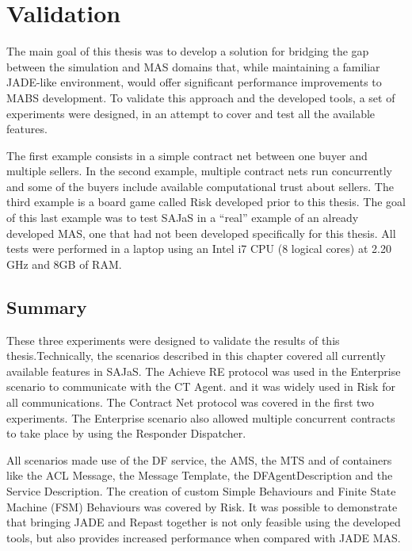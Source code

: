 \chapter{Validation}
\label{chap:validation}

The main goal of this thesis was to develop a solution for bridging the gap between the simulation and MAS domains that, while maintaining a familiar JADE-like environment, would offer significant performance improvements to MABS development. To validate this approach and the developed tools, a set of experiments were designed, in an attempt to cover and test all the available features.

The first example consists in a simple contract net between one buyer and multiple sellers. In the second example, multiple contract nets run concurrently and some of the buyers include available computational trust about sellers. 
The third example is a board game called Risk developed prior to this thesis. The goal of this last example was to test SAJaS in a ``real'' example of an already developed MAS, one that had not been developed specifically for this thesis.
All tests were performed in a laptop using an Intel i7 CPU (8 logical cores) at 2.20 GHz and 8GB of RAM.








\section{Summary}

These three experiments were designed to validate the results of this thesis.Technically, the scenarios described in this chapter covered all currently available features in SAJaS. The Achieve RE protocol was used in the Enterprise scenario to communicate with the CT Agent.
and it was widely used in Risk for all communications.
The Contract Net protocol was covered in the first two experiments. The Enterprise scenario also allowed multiple concurrent contracts to take place by using the Responder Dispatcher.

All scenarios made use of the DF service, the AMS, the MTS and of containers like the ACL Message, the Message Template, the DFAgentDescription and the Service Description.
The creation of custom Simple Behaviours and Finite State Machine (FSM) Behaviours was covered by Risk.
It was possible to demonstrate that bringing JADE and Repast together is not only feasible using the developed tools, but also provides increased performance when compared with JADE MAS.


